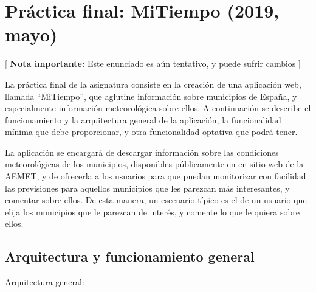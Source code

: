 \newpage

\section{Práctica final: MiTiempo (2019, mayo)}
\label{practica-final-2019-05}

[ \textbf{Nota importante:} Este enunciado es aún tentativo, y puede sufrir cambios ]

La práctica final de la asignatura consiste en la creación de una aplicación web, llamada ``MiTiempo'', que aglutine información sobre municipios de España, y especialmente información meteorológica sobre ellos. A continuación se describe el funcionamiento y la arquitectura general de la aplicación, la funcionalidad mínima que debe proporcionar, y otra funcionalidad optativa que podrá tener.

La aplicación se encargará de descargar información sobre las condiciones meteorológicas de los municipios, disponibles públicamente en en sitio web de la AEMET, y de ofrecerla a los usuarios para que puedan monitorizar con facilidad las previsiones para aquellos municipios que les parezcan más interesantes, y comentar sobre ellos. De esta manera, un escenario típico es el de un usuario que elija los municipios que le parezcan de interés, y comente lo que le quiera sobre ellos.

\subsection{Arquitectura y funcionamiento general}

Arquitectura general:

